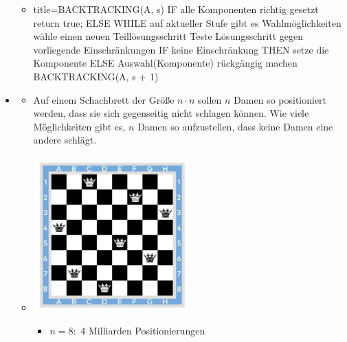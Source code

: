 \documentclass[
    12pt,
    a4paper,
    ngerman,
    color=3b,%
    marginpar=false,
    colorback=false,
    leqno,
]{tudaexercise}
\begin{document}
\begin{itemize}
\begin{itemize}
                \item[]
                    \begin{ccode}[autogobble]{title={BACKTRACKING(A, s)}}
                    IF alle Komponenten richtig gesetzt
                        return true;
                    ELSE
                        WHILE auf aktueller Stufe gibt es Wahlmöglichkeiten
                            wähle einen neuen Teillösungsschritt
                            Teste Lösungsschritt gegen vorliegende Einschränkungen
                            IF keine Einschränkung THEN
                                setze die Komponente
                            ELSE
                                Auswahl(Komponente) rückgängig machen
                            BACKTRACKING(A, s + 1)
                    \end{ccode}
            \end{itemize}
\clearpage
        \item {}
            \begin{itemize}
                \item[]
                    Auf einem Schachbrett der Größe $n \cdot n$ sollen $n$ Damen so positioniert werden, dass sie sich 
                    gegenseitig nicht schlagen können. Wie viele Möglichkeiten gibt es, $n$ Damen so aufzustellen, dass keine
                    Damen eine andere schlägt.
                \item[]
                    \begin{minipage}{0.3\textwidth}
                        \includegraphics[width=6cm]{pictures/damenproblem.PNG}
                    \end{minipage}
                    \begin{minipage}{0.6\textwidth}
                        \begin{itemize}
                            \item $n=8:$ 4 Milliarden Positionierungen

\end{itemize}
\end{minipage}
\end{itemize}
\end{itemize}
\end{document}
